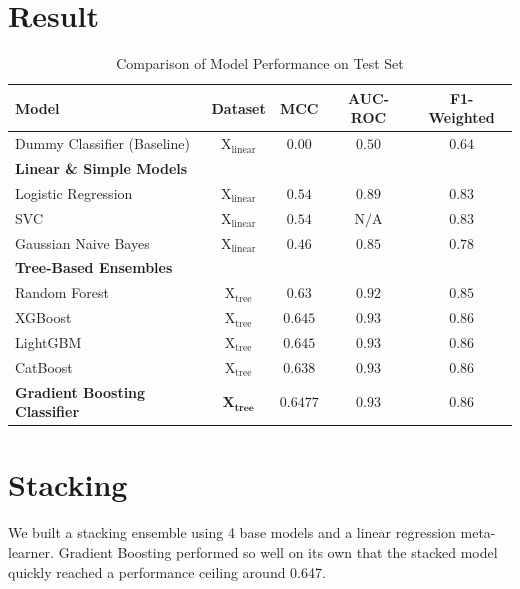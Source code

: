 \section{Result}

\begin{table}[H]
    \centering
    \label{tab:model_results}
    \begin{tabular}{||l|c|c|c|c||}
        \toprule
        \textbf{Model} & \textbf{Dataset} & \textbf{MCC} & \textbf{AUC-ROC} & \textbf{F1-Weighted} \\
        \midrule
        \midrule
        Dummy Classifier (Baseline) & $\text{X}_{\text{linear}}$ & $ 0.00$ & $ 0.50$ & $ 0.64$ \\
        \midrule
        \textbf{Linear \& Simple Models} & & & & \\
        Logistic Regression & $\text{X}_{\text{linear}}$ & $0.54$ & $0.89$ & $0.83$ \\
        SVC & $\text{X}_{\text{linear}}$ & $0.54$ & $\text{N/A}$ & $0.83$ \\
        Gaussian Naive Bayes & $\text{X}_{\text{linear}}$ & $0.46$ & $0.85$ & $0.78$ \\
        \midrule
        \textbf{Tree-Based Ensembles} & & & & \\
        Random Forest & $\text{X}_{\text{tree}}$ & $0.63$ & $0.92$ & $0.85$ \\
        XGBoost & $\text{X}_{\text{tree}}$ & $ 0.645$ & $0.93$ & $ 0.86$ \\
        LightGBM & $\text{X}_{\text{tree}}$ & $ 0.645$ & $0.93$ & $ 0.86$ \\
        CatBoost & $\text{X}_{\text{tree}}$ & $0.638$ & $0.93$ & $0.86$ \\
        \textbf{Gradient Boosting Classifier} & $\mathbf{X_{\text{tree}}}$ & $\mathbf{0.6477}$ & $\mathbf{0.93}$ & $\mathbf{0.86}$ \\
        \bottomrule
    \end{tabular}
    \caption{Comparison of Model Performance on Test Set}

\end{table}

\clearpage

\section{Stacking}

We built a stacking ensemble using 4 base models and a linear regression meta-learner. Gradient Boosting performed so well on its own that the stacked model quickly reached a performance ceiling around 0.647.

